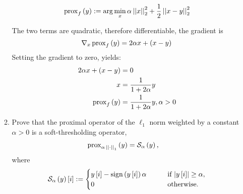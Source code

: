 \documentclass[12pt,twoside]{article}
\begin{document}
\begin{enumerate}
\begin{enumerate}
\begin{align*}
\operatorname{prox}_{f}\left( y \right) := \arg \min_{x}  \alpha \left|\left| x \right|\right| _{2}^2 + \frac{1}{2} \left|\left| x-y \right|\right| _{2}^2
\end{align*}

The two terms are quadratic, therefore differentiable, the gradient is 
$$
	\nabla_x \operatorname{prox}_{f}\left( y \right) = 2 \alpha x + (x-y)
$$
 Setting the gradient to zero, yields:
\begin{align*}
	2 \alpha x + (x-y)			&= 	0 \\
		x 					&= \frac{1} {1+2 \alpha} y \\
		\operatorname{prox}_{f}\left( y \right) 		&=	 \frac{1} {1+2 \alpha} y, \alpha > 0 \\
\end{align*}
 
  \item Prove that the proximal operator of the $\ell_1$ norm weighted by a constant $\alpha > 0$ is a soft-thresholding operator,
\begin{align}
\operatorname{prox}_{\alpha \, \left|\left|  \cdot  \right|\right| _{1}}\left(  y  \right) & = \mathcal{ S }_{\alpha}\left( y \right),
\end{align}
where 
\begin{align}
\mathcal{ S }_{\alpha}\left( y \right)[i] := 
\begin{cases}
y\,[i] - \operatorname{sign}\left( y\,[i] \right) \alpha  \qquad & \text{if $\lvert y\,[i]\rvert \geq \alpha$}, \\
0 \quad & \text{otherwise}.
\end{cases}
\end{align}\\


\end{enumerate}
\end{enumerate}
\end{document}
